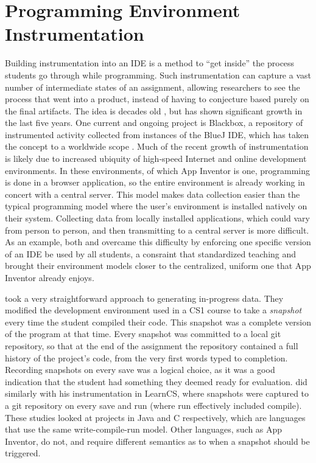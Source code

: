 \section{Programming Environment Instrumentation}
Building instrumentation into an IDE is a method to ``get inside'' the process students go through while programming. Such instrumentation can capture a vast number of intermediate states of an assignment, allowing researchers to see the process that went into a product, instead of having to conjecture based purely on the final artifacts. The idea is decades old \citep{spohrer1985goal}, but has shown significant growth in the last five years. One current and ongoing project is Blackbox, a repository of instrumented activity collected from instances of the BlueJ IDE, which has taken the concept to a worldwide scope \citep{brown2014blackbox}. Much of the recent growth of instrumentation is likely due to increased ubiquity of high-speed Internet and online development environments. In these environments, of which App Inventor is one, programming is done in a browser application, so the entire environment is already working in concert with a central server. This model makes data collection easier than the typical programming model where the user's environment is installed natively on their system. Collecting data from locally installed applications, which could vary from person to person, and then transmitting to a central server is more difficult. As an example, both \citet{piech-2012} and \citet{brown2014blackbox} overcame this difficulty by enforcing one specific version of an IDE be used by all students, a consraint that standardized teaching and brought their environment models closer to the centralized, uniform one that App Inventor already enjoys.

\citet{piech-2012} took a very straightforward approach to generating in-progress data. They modified the development environment used in a CS1 course to take a \emph{snapshot} every time the student compiled their code. This snapshot was a complete version of the program at that time. Every snapshot was committed to a local git repository, so that at the end of the assignment the repository contained a full history of the project's code, from the very first words typed to completion. Recording snapshots on every save was a logical choice, as it was a good indication that the student had something they deemed ready for evaluation. \citet{lipman-phd} did similarly with his instrumentation in LearnCS, where snapshots were captured to a git repository on every save and run (where run effectively included compile). These studies looked at projects in Java and C respectively, which are languages that use the same write-compile-run model. Other languages, such as App Inventor, do not, and require different semantics as to when a snapshot should be triggered.


\label{sec:teacher-dashboards}


